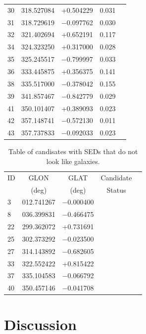 \documentclass[times,usenatbib]{mn2e}
\begin{document}
\begin{table}
\begin{center}
\begin{tabular}{lcccc}
30 & 318.527084 &   +0.504229 & 0.031 & \\
31 & 318.729619 & $-$0.097762 & 0.030 & \\
32 & 321.402694 &   +0.652191 & 0.117 & \\
34 & 324.323250 &   +0.317000 & 0.028 & \\
35 & 325.245517 & $-$0.799997 & 0.033 & \\
36 & 333.445875 &   +0.356375 & 0.141 & \\
38 & 335.517000 & $-$0.378042 & 0.155 & \\
39 & 341.857467 & $-$0.842779 & 0.029 & \\
41 & 350.101407 &   +0.389093 & 0.023 & \\
42 & 357.148741 & $-$0.572130 & 0.011 & \\
43 & 357.737833 & $-$0.092033 & 0.023 & \\
\hline
\end{tabular}
\end{center}
\label{galaxy-catalogue}
\end{table}

\begin{table}
\begin{center}
\caption{Table of candisates with SEDs that do not look like galaxies.}
\begin{tabular}{lcccc}
\hline
ID & GLON & GLAT & Candidate \\
 & (deg) & (deg) & Status \\
\hline
 3 & 012.741267 & $-$0.000400 &  \\
 8 & 036.399831 & $-$0.466475 &  \\
22 & 299.362072 &   +0.731691 &  \\
25 & 302.373292 & $-$0.023500 &  \\
27 & 314.143892 & $-$0.682605 &  \\
33 & 322.552422 &   +0.815422 &  \\
37 & 335.104583 & $-$0.066792 &  \\
40 & 350.457146 & $-$0.041708 &  \\
\hline
\end{tabular}
\end{center}
\label{other-catalogue}
\end{table}

\section{Discussion}
\end{document}
